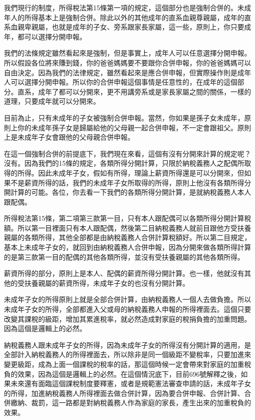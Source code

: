 \documentclass[oneside,sub3section]{ctexbook}
\begin{document}
我們現行的制度，所得稅法第15條第一項的規定，這個部分也是強制合併的。未成年人的所得基本上是強制合併。除此以外的其他成年的直系血親尊親屬，成年的直系血親卑親屬，也就是成年的子女、旁系跟家長家屬，這一些，原則上，你只要成年，都可以選擇分開申報。

我們的法條規定雖然看起來是強制，但是事實上，成年人可以任意選擇分開申報。所以假設各位將來賺到錢，你的爸爸媽媽要不要跟你合併申報，你的爸爸媽媽可以自由決定。因為我們的法律規定，雖然看起來是應合併申報，但實際操作則是成年人可以選擇分開申報。所以你的合併申報這個事情是任意性的，在成年的這個部分。直系，成年了都可以分開來，更不用講旁系或是家長家屬之間的關係，一樣的道理，只要成年就可以分開來。

目前為止，只有未成年的子女被強制合併申報。當然，你如果是孫子女未成年，原則上你的未成年孫子女是歸屬給他的父母親一起合併申報，不一定會跟祖父。原則上是未成年子女會跟他的父母親合併申報。

在這一個強制合併的前提底下，我們現在來看，這個有沒有分開來計算的規定呢？沒有。因為我們的15條的規定，各類所得分開計算，只限於納稅義務人之配偶所取得的所得。因此未成年子女，假如有所得，理論上薪資所得還是可以分開來，但如果不是薪資所得的話，我們的未成年子女所取得的所得，原則上他沒有各類所得分開計算的可能。各位，你去看一下我們的各類所得分開計算，是就納稅義務人本人跟配偶。

所得稅法第15條，第二項第三款第一目，只有本人跟配偶可以各類所得分開計算稅額。所以第一目裡面只有本人跟配偶，然後第二目納稅義務人就前目跟他方受扶養親屬的各類所得，其他全部都是由納稅義務人合併計算稅額好。所以第二目規定，基本上未成年子女的，就回到由納稅義務人合併申報，因為分開來做各類所得計算的是第三款第一目的配偶的其他各類所得，並沒有受扶養親屬的其他各類所得。

薪資所得的部分，原則上是本人、配偶的薪資所得分開計算。也一樣，他就沒有其他的受扶養親屬的薪資所得，未成年子女的也沒有分開計算。

未成年子女的所得原則上就是全部合併計算，由納稅義務人一個人去做負擔。所以未成年子女的所得，全部都進入父或母的納稅義務人申報的所得裡面去。這個只要改變其課稅的級距，增加其累進稅率，就必然造成對家庭的稅捐負擔的加重問題。因為這個是邏輯上的必然。

納稅義務人跟未成年子女的所得，因為未成年子女的所得沒有分開計算的適用，是全部計入納稅義務人的所得裡面去，所以除非是同一個級距不變稅率，只要加進來變更級距，成為上面一個課稅的稅率的話，那這個時候一定會帶來對家庭的加重稅負的效果，因為這個是邏輯上的必然。在這個情況底下，目前696號解釋之後，如果未來還有面臨這個課稅制度要釋憲，或者是規範憲法審查申請的話，未成年子女的所得，加進納稅義務人所得裡面去做合併計算，因為要合併申報、合併計算、合併繳納、裁罰，這一路都是對納稅義務人作為家庭的家長，產生出來的加重稅負的效果。
\end{document}
